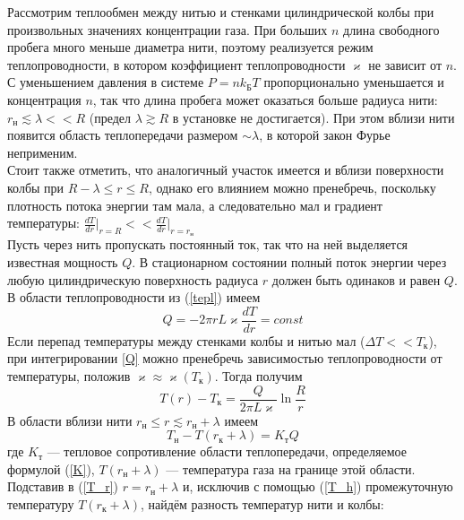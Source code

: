 \documentclass[12pt]{article}
\begin{document}
        Рассмотрим теплообмен между нитью и стенками цилиндрической колбы при произвольных значениях концентрации газа.
        При больших $n$ длина свободного пробега много меньше диаметра нити, поэтому реализуется режим теплопроводности, в
        котором коэффициент теплопроводности $\varkappa$ не зависит от $n$. С уменьшением давления в
        системе $P = nk_{\text{Б}}T$ пропорционально уменьшается и концентрация $n$, так что длина пробега может оказаться больше
        радиуса нити: $r_{\text{н}} \lesssim \lambda << R$ (предел $\lambda \gtrsim R$ в установке не достигается). При этом вблизи нити появится
        область теплопередачи размером $\sim \lambda$, в которой закон Фурье неприменим.\\
        Стоит также отметить, что аналогичный участок имеется и вблизи поверхности колбы при $R - \lambda \le r \le R$, однако
        его влиянием можно пренебречь, поскольку плотность потока энергии там мала, а следовательно мал и
        градиент температуры: $\frac{dT}{dr}\bigg|_{r=R} << \frac{dT}{dr}\bigg|_{r=r_{\text{н}}} $\\
        Пусть через нить пропускать постоянный ток, так что на ней выделяется известная мощность $Q$. В стационарном состоянии полный поток энергии через
        любую цилиндрическую поверхность радиуса $r$ должен быть одинаков и равен $Q$. В области теплопроводности из (\ref{tepl}) имеем
        \begin{equation}\label{Q}
            Q = -2\pi r L\varkappa \frac{dT}{dr} = const
        \end{equation}
        Если перепад температуры между стенками колбы и нитью мал ($\Delta T << T_{\text{к}}$), при интегрировании \ref{Q} можно пренебречь зависимостью теплопроводности
        от температуры, положив $\varkappa \approx \varkappa(T_{\text{к}})$. Тогда получим
        \begin{equation}\label{T_r}
            T(r) - T_{\text{к}} = \frac{Q}{2\pi L\varkappa}\ln \frac{R}{r}
        \end{equation}
        В области вблизи нити $r_{\text{н}} \le r \lesssim r_{\text{н}} + \lambda$ имеем
        \begin{equation}\label{T_h}
            T_{\text{н}} - T(r_{\text{к}} + \lambda) = K_{\text{т}}Q
        \end{equation}
        где $K_{\text{т}}$ — тепловое сопротивление области теплопередачи, определяемое формулой (\ref{K}), $T(r_{\text{н}} + \lambda)$ — температура газа на границе этой области. Подставив
        в (\ref{T_r}) $r = r_{\text{н}} + \lambda$ и, исключив с помощью (\ref{T_h}) промежуточную температуру $T(r_{\text{к}} + \lambda)$, найдём разность температур нити и колбы:
\end{document}
